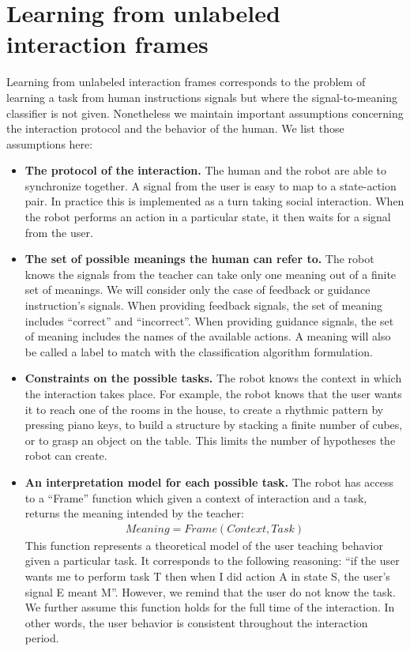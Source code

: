 

\section{Learning from unlabeled interaction frames}
\label{chapter:introduction:lfui}

Learning from unlabeled interaction frames corresponds to the problem of learning a task from human instructions signals but where the signal-to-meaning classifier is not given. Nonetheless we maintain important assumptions concerning the interaction protocol and the behavior of the human. We list those assumptions here:

\begin{itemize}

\item \textbf{The protocol of the interaction.} The human and the robot are able to synchronize together. A signal from the user is easy to map to a state-action pair. In practice this is implemented as a turn taking social interaction. When the robot performs an action in a particular state, it then waits for a signal from the user.

\item \textbf{The set of possible meanings the human can refer to.} The robot knows the signals from the teacher can take only one meaning out of a finite set of meanings. We will consider only the case of feedback or guidance instruction's signals. When providing feedback signals, the set of meaning includes ``correct'' and ``incorrect''. When providing guidance signals, the set of meaning includes the names of the available actions. A meaning will also be called a label to match with the classification algorithm formulation. 

\item \textbf{Constraints on the possible tasks.} The robot knows the context in which the interaction takes place. For example, the robot knows that the user wants it to reach one of the rooms in the house, to create a rhythmic pattern by pressing piano keys, to build a structure by stacking a finite number of cubes, or to grasp an object on the table. This limits the number of hypotheses the robot can create.

\item \textbf{An interpretation model for each possible task.} The robot has access to a ``Frame'' function which given a context of interaction and a task, returns the meaning intended by the teacher:
%
\begin{eqnarray}
Meaning = Frame(Context, Task) \nonumber
\end{eqnarray}
%
This function represents a theoretical model of the user teaching behavior given a particular task. It corresponds to the following reasoning: ``if the user wants me to perform task T then when I did action A in state S, the user's signal E meant M''. However, we remind that the user do not know the task. We further assume this function holds for the full time of the interaction. In other words, the user behavior is consistent throughout the interaction period.


\end{itemize}
